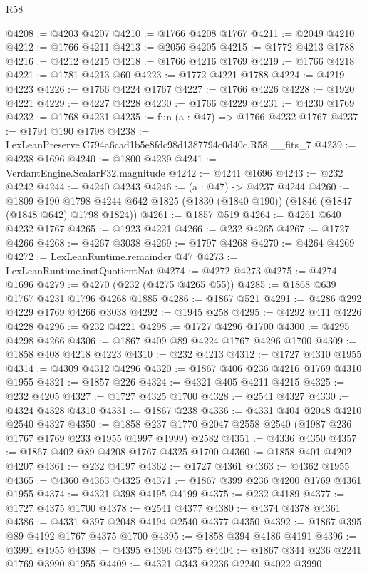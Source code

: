 \begin{lexlean}{R58}
\begin{coremodule}
@4208 := @4203 @4207
@4210 := @1766 @4208 @1767
@4211 := @2049 @4210
@4212 := @1766 @4211
@4213 := @2056 @4205
@4215 := @1772 @4213 @1788
@4216 := @4212 @4215
@4218 := @1766 @4216 @1769
@4219 := @1766 @4218
@4221 := @1781 @4213 @60
@4223 := @1772 @4221 @1788
@4224 := @4219 @4223
@4226 := @1766 @4224 @1767
@4227 := @1766 @4226
@4228 := @1920 @4221
@4229 := @4227 @4228
@4230 := @1766 @4229
@4231 := @4230 @1769
@4232 := @1768 @4231
@4235 := fun (a : @47) => @1766 @4232 @1767
@4237 := @1794 @190 @1798
@4238 := LexLeanPreserve.C794a6cad1b5e8fdc98d1387794c0d40c.R58.__fits_7
@4239 := @4238 @1696
@4240 := @1800 @4239
@4241 := VerdantEngine.ScalarF32.magnitude
@4242 := @4241 @1696
@4243 := @232 @4242
@4244 := @4240 @4243
@4246 := (a : @47) -> @4237 @4244
@4260 := @1809
    @190
    @1798
    @4244
    @642
    @1825
    (@1830 (@1840 @190))
    (@1846 (@1847 (@1848 @642) @1798 @1824))
@4261 := @1857 @519
@4264 := @4261 @640 @4232 @1767
@4265 := @1923 @4221
@4266 := @232 @4265
@4267 := @1727 @4266
@4268 := @4267 @3038
@4269 := @1797 @4268
@4270 := @4264 @4269
@4272 := LexLeanRuntime.remainder @47
@4273 := LexLeanRuntime.instQuotientNat
@4274 := @4272 @4273
@4275 := @4274 @1696
@4279 := @4270 (@232 (@4275 @4265 @55))
@4285 := @1868 @639 @1767 @4231 @1796 @4268 @1885
@4286 := @1867 @521
@4291 := @4286 @292 @4229 @1769 @4266 @3038
@4292 := @1945 @258
@4295 := @4292 @411 @4226 @4228
@4296 := @232 @4221
@4298 := @1727 @4296 @1700
@4300 := @4295 @4298 @4266
@4306 := @1867 @409 @89 @4224 @1767 @4296 @1700
@4309 := @1858 @408 @4218 @4223
@4310 := @232 @4213
@4312 := @1727 @4310 @1955
@4314 := @4309 @4312 @4296
@4320 := @1867 @406 @236 @4216 @1769 @4310 @1955
@4321 := @1857 @226
@4324 := @4321 @405 @4211 @4215
@4325 := @232 @4205
@4327 := @1727 @4325 @1700
@4328 := @2541 @4327
@4330 := @4324 @4328 @4310
@4331 := @1867 @238
@4336 := @4331 @404 @2048 @4210 @2540 @4327
@4350 := @1858 @237 @1770 @2047 @2558 @2540 (@1987 @236 @1767 @1769 @233 @1955 @1997 @1999) @2582
@4351 := @4336 @4350
@4357 := @1867 @402 @89 @4208 @1767 @4325 @1700
@4360 := @1858 @401 @4202 @4207
@4361 := @232 @4197
@4362 := @1727 @4361
@4363 := @4362 @1955
@4365 := @4360 @4363 @4325
@4371 := @1867 @399 @236 @4200 @1769 @4361 @1955
@4374 := @4321 @398 @4195 @4199
@4375 := @232 @4189
@4377 := @1727 @4375 @1700
@4378 := @2541 @4377
@4380 := @4374 @4378 @4361
@4386 := @4331 @397 @2048 @4194 @2540 @4377 @4350
@4392 := @1867 @395 @89 @4192 @1767 @4375 @1700
@4395 := @1858 @394 @4186 @4191
@4396 := @3991 @1955
@4398 := @4395 @4396 @4375
@4404 := @1867 @344 @236 @2241 @1769 @3990 @1955
@4409 := @4321 @343 @2236 @2240 @4022 @3990

\end{coremodule}
\end{lexlean}
